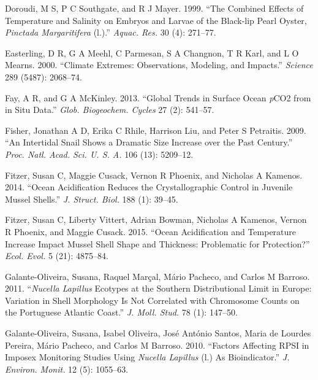 \documentclass[smallextended]{svjour3}       %
\newlength{\cslhangindent}
\newenvironment{CSLReferences}[2] %
 {%
  \setlength{\parindent}{0pt}
  \ifodd #1 \everypar{\setlength{\hangindent}{\cslhangindent}}\ignorespaces\fi
  \ifnum #2 > 0
  \setlength{\parskip}{#2\baselineskip}
  \fi
 }%
 {}
\begin{document}
\begin{CSLReferences}{1}{0}
\leavevmode{}%
Doroudi, M S, P C Southgate, and R J Mayer. 1999. {``The Combined
Effects of Temperature and Salinity on Embryos and Larvae of the
Black‐lip Pearl Oyster, \emph{Pinctada Margaritifera} (l.).''}
\emph{Aquac. Res.} 30 (4): 271--77.

\leavevmode{}%
Easterling, D R, G A Meehl, C Parmesan, S A Changnon, T R Karl, and L O
Mearns. 2000. {``Climate Extremes: Observations, Modeling, and
Impacts.''} \emph{Science} 289 (5487): 2068--74.

\leavevmode{}%
Fay, A R, and G A McKinley. 2013. {``Global Trends in Surface Ocean
\emph{p}CO2 from in Situ Data.''} \emph{Glob. Biogeochem. Cycles} 27
(2): 541--57.

\leavevmode{}%
Fisher, Jonathan A D, Erika C Rhile, Harrison Liu, and Peter S
Petraitis. 2009. {``An Intertidal Snail Shows a Dramatic Size Increase
over the Past Century.''} \emph{Proc. Natl. Acad. Sci. U. S. A.} 106
(13): 5209--12.

\leavevmode{}%
Fitzer, Susan C, Maggie Cusack, Vernon R Phoenix, and Nicholas A
Kamenos. 2014. {``Ocean Acidification Reduces the Crystallographic
Control in Juvenile Mussel Shells.''} \emph{J. Struct. Biol.} 188 (1):
39--45.

\leavevmode{}%
Fitzer, Susan C, Liberty Vittert, Adrian Bowman, Nicholas A Kamenos,
Vernon R Phoenix, and Maggie Cusack. 2015. {``Ocean Acidification and
Temperature Increase Impact Mussel Shell Shape and Thickness:
Problematic for Protection?''} \emph{Ecol. Evol.} 5 (21): 4875--84.

\leavevmode{}%
Galante-Oliveira, Susana, Raquel Marçal, Mário Pacheco, and Carlos M
Barroso. 2011. {``\emph{Nucella Lapillus} Ecotypes at the Southern
Distributional Limit in Europe: Variation in Shell Morphology Is Not
Correlated with Chromosome Counts on the Portuguese Atlantic Coast.''}
\emph{J. Moll. Stud.} 78 (1): 147--50.

\leavevmode{}%
Galante-Oliveira, Susana, Isabel Oliveira, José António Santos, Maria de
Lourdes Pereira, Mário Pacheco, and Carlos M Barroso. 2010. {``Factors
Affecting RPSI in Imposex Monitoring Studies Using \emph{Nucella
Lapillus} (l.) As Bioindicator.''} \emph{J. Environ. Monit.} 12 (5):
1055--63.


\end{CSLReferences}
\end{document}
